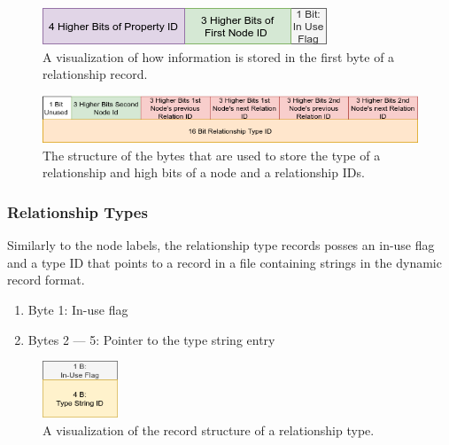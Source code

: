 \documentclass[a4paper,10pt]{article}
\begin{document}
            \begin{figure}[htp]\label{rel_first_byte}
                \begin{center}
                    \includegraphics[keepaspectratio,width=\textwidth]{img/03_record/relationship/relationship_first_byte.png}
                \end{center}
                \caption{A visualization of how information is stored in the first byte of a relationship record.} %
            \end{figure}

            \begin{figure}[htp]\label{rel_type_bytes}
                \begin{center}
                    \includegraphics[keepaspectratio,width=\textwidth]{img/03_record/relationship/relationship_type_bytes.png}
                \end{center}
                \caption{The structure of the bytes that are used to store the type of a relationship and high bits of a node and a relationship IDs.} %
            \end{figure}
        

        \subsubsection{Relationship Types}
            Similarly to the node labels, the relationship type records posses an in-use flag and a type ID that points to a record in a file containing strings in the dynamic record format.
            \begin{enumerate}
                \item Byte 1: In-use flag
                \item Bytes 2 --- 5: Pointer to the type string entry
            \end{enumerate}
        
            \begin{figure}[htp]\label{rel_type_record}
                \begin{center}
                    \includegraphics[keepaspectratio,height=0.2\textheight,width=0.2\textwidth]{img/03_record/relationship/rel_type_record.png}
                \end{center}
                \caption{A visualization of the record structure of a relationship type.} %
            \end{figure}
            
\end{document}
